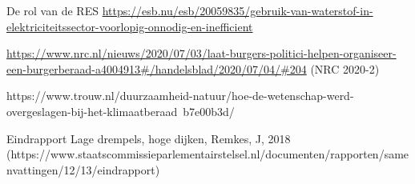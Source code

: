 \begin{voorstel}{De rol van de RES}
\url{https://esb.nu/esb/20059835/gebruik-van-waterstof-in-elektriciteitssector-voorlopig-onnodig-en-inefficient}

\url{https://www.nrc.nl/nieuws/2020/07/03/laat-burgers-politici-helpen-organiseer-een-burgerberaad-a4004913#/handelsblad/2020/07/04/#204} (NRC 2020-2)

https://www.trouw.nl/duurzaamheid-natuur/hoe-de-wetenschap-werd-overgeslagen-bij-het-klimaatberaad~b7e00b3d/

Eindrapport Lage drempels, hoge dijken, Remkes, J, 2018 (https://www.staatscommissieparlementairstelsel.nl/documenten/rapporten/samenvattingen/12/13/eindrapport)


\end{voorstel}
